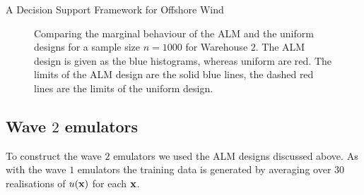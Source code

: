 \begin{chapter}{A Decision Support Framework for Offshore Wind \label{Ch:ds-for-ow}}
\begin{figure}
 \caption{Comparing the marginal behaviour of the ALM and the uniform designs for a sample size $n = 1000$ for Warehouse $2$. The ALM design is given as the blue histograms, whereas uniform are red. The limits of the ALM design are the solid blue lines, the dashed red lines are the limits of the uniform design.\label{Fig:alm-vs-unif2}}
\end{figure}
\subsection{Wave $2$ emulators}

To construct the wave $2$ emulators we used the ALM designs discussed above. As with the wave $1$ emulators the training data is generated by averaging over $30$ realisations of $u(\mathbf{x})$ for each $\mathbf{x}$.


\end{chapter}

